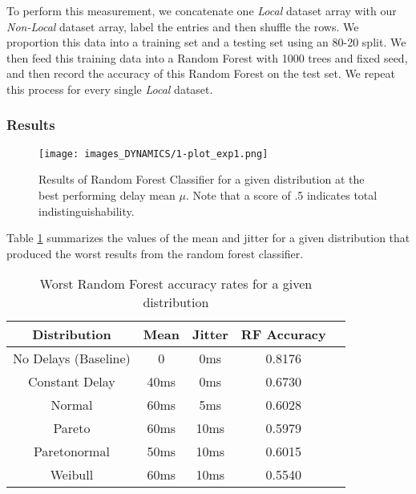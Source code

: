 To perform this measurement, we concatenate one \textit{Local} dataset array with our \textit{Non-Local} dataset array, label the entries and then shuffle the rows. We proportion this data into a training set and a testing set using an 80-20 split. We then feed this training data into a Random Forest with 1000 trees and fixed seed, and then record the accuracy of this Random Forest on the test set. We repeat this process for every single \textit{Local} dataset.

\subsubsection*{Results}


\begin{figure}
\captionsetup{justification=centering}
\centering
\texttt{[image: images\_DYNAMICS/1-plot\_exp1.png]}
\caption{Results of Random Forest Classifier for a given distribution at the best performing delay mean $\mu$. Note that a score of .5 indicates total indistinguishability.}
\label{Fig:rf_graph}
\end{figure}

Table \ref{tab:results-iat_rf} summarizes the values of the mean and jitter for a given distribution that produced the worst results from the random forest classifier.


\begin{table}[ht!]
\begin{center}
\begin{small}
\begin{sc}
\begin{tabular}{ccccc}
\hline
Distribution & Mean & Jitter & RF Accuracy\\
\hline
No Delays (Baseline) & 0 & 0ms & 0.8176 \\
Constant Delay & 40ms & 0ms & 0.6730 \\
Normal & 60ms & 5ms & 0.6028 \\
Pareto & 60ms & 10ms & 0.5979 \\
Paretonormal & 50ms & 10ms & 0.6015 \\
Weibull & 60ms & 10ms & 0.5540 \\
\hline
\end{tabular}
\end{sc}
\end{small}
\caption{Worst Random Forest accuracy rates for a given distribution}
\label{tab:results-iat_rf}
\end{center}
\vskip -4mm
\end{table}

